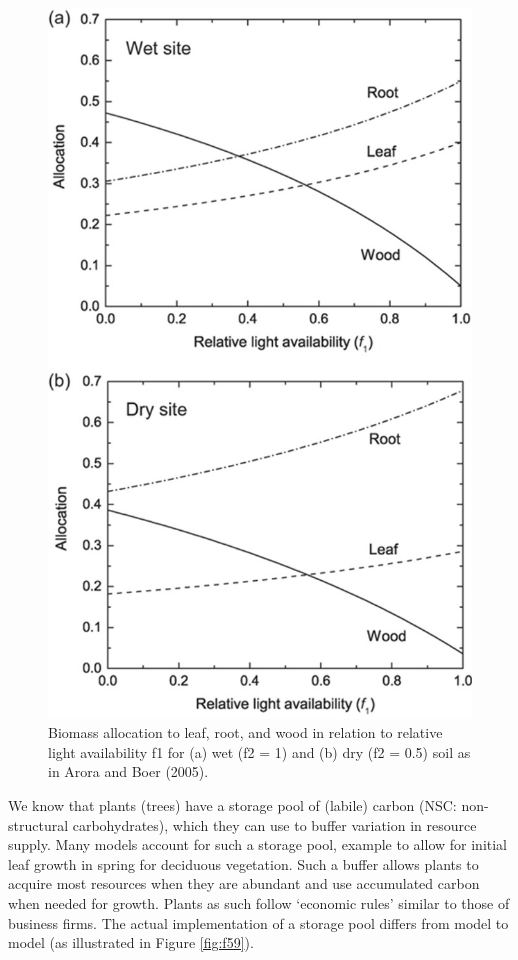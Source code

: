 \documentclass[12pt,oneside]{book}
\begin{document}
\begin{figure}

{\centering \includegraphics[width=0.8\linewidth]{figures/chap5/f58_alloc_factors} 

}

\caption{Biomass allocation to leaf, root, and wood in relation to relative light availability f1 for (a) wet (f2 = 1) and (b) dry (f2 = 0.5) soil as in Arora and Boer (2005).}\label{fig:f58}
\end{figure}

We know that plants (trees) have a storage pool of (labile) carbon (NSC:
non-structural carbohydrates), which they can use to buffer variation in
resource supply. Many models account for such a storage pool, example to
allow for initial leaf growth in spring for deciduous vegetation. Such a
buffer allows plants to acquire most resources when they are abundant
and use accumulated carbon when needed for growth. Plants as such follow
`economic rules' similar to those of business firms. The actual
implementation of a storage pool differs from model to model (as
illustrated in Figure \ref{fig:f59}).
\end{document}
